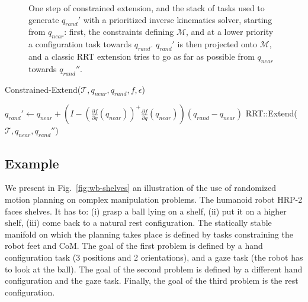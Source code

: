 \documentclass{article}
\begin{document}
\begin{figure}[h]
\begin{minipage}[c]{0.3\linewidth}
\end{minipage}

\caption{One step of constrained extension, and the stack of tasks used
  to generate $q_{rand}'$ with a prioritized inverse kinematics solver, 
  starting from $q_{near}$:
  first, the constraints defining $\mathcal{M}$, and at a lower priority
  a configuration task towards $q_{rand}$.  $q_{rand}'$ is then projected onto
  $\mathcal{M}$, and a classic RRT extension tries to go as far as possible
  from $q_{near}$ towards $q_{rand}''$.}
\label{fig:gikrrt}
\end{figure}





\begin{algorithm}[h]
  \caption{Constrained-Extend($\mathcal{T},q_{near},q_{rand},f,\epsilon$)}
  \label{alg:constrained}
  \begin{algorithmic}
    \STATE $q_{rand}' \leftarrow q_{near} +   
    \left(I -  
    \left(\frac{\partial f}{\partial q}(q_{near})\right)^{+}
    \frac{\partial f}{\partial q}(q_{near})\right) (q_{rand} - q_{near})$
    \STATE RRT::Extend($\mathcal{T},q_{near},q_{rand}''$)
    \ENDIF
  \end{algorithmic}
\end{algorithm}







\subsection{Example}

We present in Fig.~\ref{fig:wb-shelves} an illustration of 
the use of randomized motion planning 
on complex manipulation problems. The humanoid robot HRP-2 faces shelves. It has to: (i) grasp
a ball lying on a shelf, (ii) put it on a higher shelf, (iii) come back to a natural
rest configuration. The statically stable manifold on which the planning takes place is
defined by tasks constraining the robot feet and CoM. The goal of the first problem
is defined by a hand configuration task (3 positions and 2 orientations), and a gaze task
(the robot has to look at the ball). The goal of the second problem is defined by a 
different hand configuration and the gaze task.
Finally, the goal of the third problem is the rest configuration.
\end{document}
